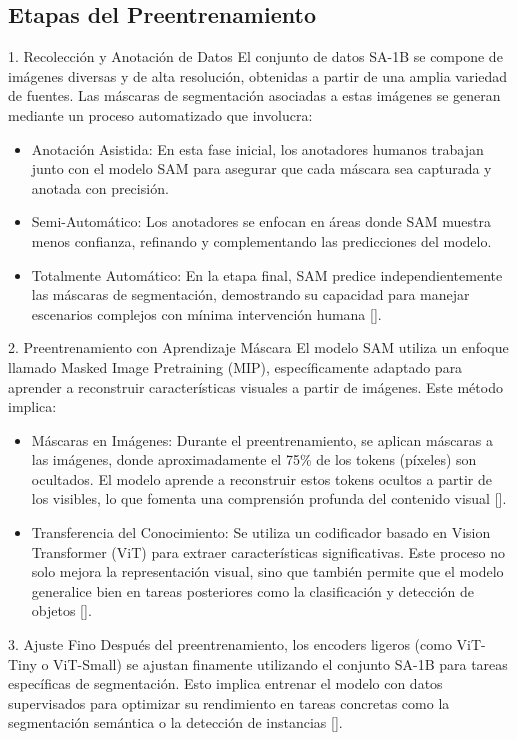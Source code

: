 \documentclass[12pt]{article}
\begin{document}
		\subsection{Etapas del Preentrenamiento}
		1. Recolección y Anotación de Datos
		El conjunto de datos SA-1B se compone de imágenes diversas y de alta resolución, obtenidas a partir de una amplia variedad de fuentes. Las máscaras de segmentación asociadas a estas imágenes se generan mediante un proceso automatizado que involucra:
		\begin{itemize}
			\item Anotación Asistida: En esta fase inicial, los anotadores humanos trabajan junto con el modelo SAM para asegurar que cada máscara sea capturada y anotada con precisión.
			\item Semi-Automático: Los anotadores se enfocan en áreas donde SAM muestra menos confianza, refinando y complementando las predicciones del modelo.
			\item Totalmente Automático: En la etapa final, SAM predice independientemente las máscaras de segmentación, demostrando su capacidad para manejar escenarios complejos con mínima intervención humana [\cite{segment_anything}].
		\end{itemize}
	
		2. Preentrenamiento con Aprendizaje Máscara
		El modelo SAM utiliza un enfoque llamado Masked Image Pretraining (MIP), específicamente adaptado para aprender a reconstruir características visuales a partir de imágenes. Este método implica:
		\begin{itemize}
				\item Máscaras en Imágenes: Durante el preentrenamiento, se aplican máscaras a las imágenes, donde aproximadamente el 75\% de los tokens (píxeles) son ocultados. El modelo aprende a reconstruir estos tokens ocultos a partir de los visibles, lo que fomenta una comprensión profunda del contenido visual [\cite{sa1b_dataset}].
				\item Transferencia del Conocimiento: Se utiliza un codificador basado en Vision Transformer (ViT) para extraer características significativas. Este proceso no solo mejora la representación visual, sino que también permite que el modelo generalice bien en tareas posteriores como la clasificación y detección de objetos [\cite{mip_pretraining}].
		\end{itemize}
	
	
		3. Ajuste Fino
		Después del preentrenamiento, los encoders ligeros (como ViT-Tiny o ViT-Small) se ajustan finamente utilizando el conjunto SA-1B para tareas específicas de segmentación. Esto implica entrenar el modelo con datos supervisados para optimizar su rendimiento en tareas concretas como la segmentación semántica o la detección de instancias [\cite{zero_shot_transfer}].
		\\
		
\end{document}
